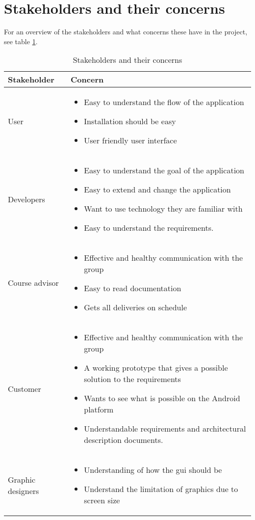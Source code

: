 \newpage

\section{Stakeholders and their concerns}
For an overview of the stakeholders and what concerns these have in the project, see table \ref{tab:stakeholders}.

\begin{table}[h!]
\begin{tabular}{p{3.5cm}|p{11.5cm}} \hline
\textbf{Stakeholder} & \textbf{Concern} \\ \hline \hline
User & 
\begin{itemize}
\item{} Easy to understand the flow of the application
\item{} Installation should be easy
\item{} User friendly user interface
\end{itemize}\\ \hline
Developers & 
\begin{itemize}
\item{}Easy to understand the goal of the application
\item{}Easy to extend and change the application
\item{}Want to use technology they are familiar with
\item{}Easy to understand the requirements.
\end{itemize}\\ \hline
Course advisor & 
\begin{itemize}
\item{}Effective and healthy communication with the group
\item{}Easy to read documentation
\item{}Gets all deliveries on schedule
\end{itemize}\\ \hline
Customer & 
\begin{itemize}
\item{}Effective and healthy communication with the group
\item{}A working prototype that gives a possible solution to the requirements
\item{}Wants to see what is possible on the Android platform
\item{}Understandable requirements and architectural description documents.
\end{itemize}\\ \hline
Graphic designers & 
\begin{itemize}
\item{}Understanding of how the \gls{gui} should be
\item{}Understand the limitation of graphics due to screen size
\end{itemize} \\ \hline
\end{tabular}
\caption{Stakeholders and their concerns} \label{tab:stakeholders}
\end{table}

